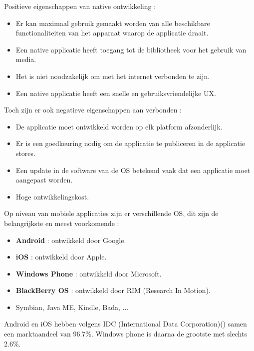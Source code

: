 Positieve eigenschappen van native ontwikkeling : 
\begin{itemize}
\item Er kan maximaal gebruik gemaakt worden van alle beschikbare functionaliteiten van het apparaat waarop de applicatie draait.
\item Een native applicatie heeft toegang tot de bibliotheek voor het gebruik van media.
\item Het is niet noodzakelijk om met het internet verbonden te zijn.
\item Een native applicatie heeft een snelle en gebruiksvriendelijke UX.
\end{itemize}
Toch zijn er ook negatieve eigenschappen aan verbonden : 
\begin{itemize}
\item De applicatie moet ontwikkeld worden op elk platform afzonderlijk.
\item Er is een goedkeuring nodig om de applicatie te publiceren in de applicatie stores.
\item Een update in de software van de OS betekend vaak dat een applicatie moet aangepast worden.
\item Hoge ontwikkelingskost.
\end{itemize}

Op niveau van mobiele applicaties zijn er verschillende OS, dit zijn de belangrijkste en meest voorkomende : 
\begin{itemize}
\item \textbf{Android} : ontwikkeld door Google.
\item \textbf{iOS} : ontwikkeld door Apple.
\item \textbf{Windows Phone} : ontwikkeld door Microsoft.
\item \textbf{BlackBerry OS} : ontwikkeld door RIM (Research In Motion).
\item Symbian, Java ME, Kindle, Bada, ... 
\end{itemize}

Android en iOS hebben volgens IDC (International Data Corporation)() samen een marktaandeel van 96.7\%. Windows phone is daarna de grootste met slechts 2.6\%. \citep{idc:mobile}

